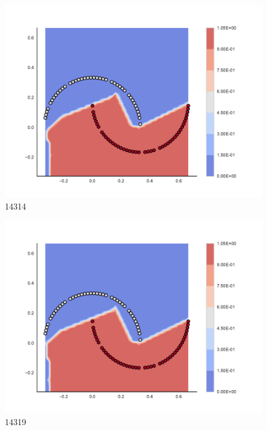 \begin{subfigure}[b]{0.09\textwidth}
    \includegraphics[clip, trim=2.35cm 1.75cm 4.5cm 0cm,width=\textwidth]{img/convergence/14314.pdf}
    \caption{14314}
    \label{fig:convergence_14314}
\end{subfigure}
%
\begin{subfigure}[b]{0.09\textwidth}
    \includegraphics[clip, trim=2.35cm 1.75cm 4.5cm 0cm,width=\textwidth]{img/convergence/14319.pdf}
    \caption{14319}
    \label{fig:convergence_14319}
\end{subfigure}
%
